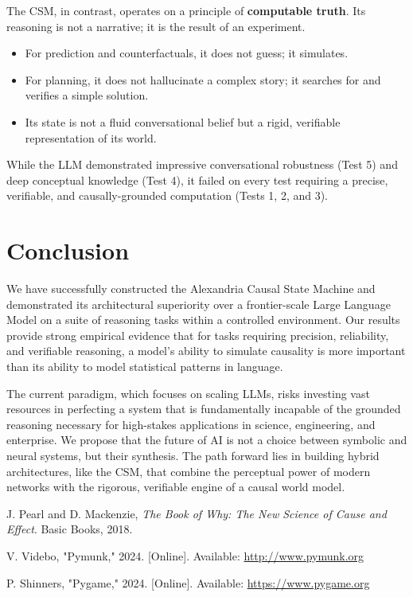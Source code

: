 \documentclass[11pt, letterpaper]{article}
\begin{document}
The CSM, in contrast, operates on a principle of \textbf{computable truth}. Its reasoning is not a narrative; it is the result of an experiment.
\begin{itemize}
    \item For prediction and counterfactuals, it does not guess; it simulates.
    \item For planning, it does not hallucinate a complex story; it searches for and verifies a simple solution.
    \item Its state is not a fluid conversational belief but a rigid, verifiable representation of its world.
\end{itemize}
While the LLM demonstrated impressive conversational robustness (Test 5) and deep conceptual knowledge (Test 4), it failed on every test requiring a precise, verifiable, and causally-grounded computation (Tests 1, 2, and 3).

\section{Conclusion}
We have successfully constructed the Alexandria Causal State Machine and demonstrated its architectural superiority over a frontier-scale Large Language Model on a suite of reasoning tasks within a controlled environment. Our results provide strong empirical evidence that for tasks requiring precision, reliability, and verifiable reasoning, a model's ability to simulate causality is more important than its ability to model statistical patterns in language.

The current paradigm, which focuses on scaling LLMs, risks investing vast resources in perfecting a system that is fundamentally incapable of the grounded reasoning necessary for high-stakes applications in science, engineering, and enterprise. We propose that the future of AI is not a choice between symbolic and neural systems, but their synthesis. The path forward lies in building hybrid architectures, like the CSM, that combine the perceptual power of modern networks with the rigorous, verifiable engine of a causal world model.

\begin{thebibliography}{9}
    J. Pearl and D. Mackenzie, \textit{The Book of Why: The New Science of Cause and Effect}. Basic Books, 2018.
    
    V. Videbo, "Pymunk," 2024. [Online]. Available: \url{http://www.pymunk.org}
    
    P. Shinners, "Pygame," 2024. [Online]. Available: \url{https://www.pygame.org}
    
\end{thebibliography}
\end{document}
